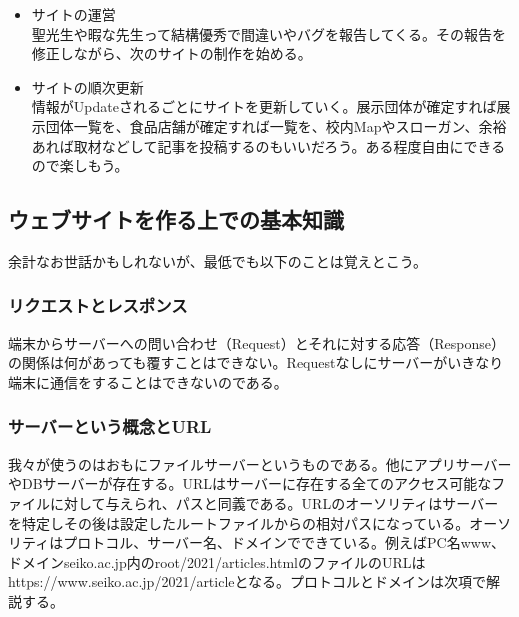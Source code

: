 \documentclass[dvipdfmx,jb5]{jarticle}
\begin{document}
\begin{itemize}
  公開には時間がかかるため、SNSや学校のサイトで告知される前にはもう公開しちゃおう。（どうせ調べても出てこない）その際、しっかりSEO対策\footnote{SEO対策とはGoogleなどの検索エンジンロボットにサイトの内容をより正確に取得してもらうようにすることを指す。}をする。僕はサボっててサイトの説明文すら書いてなかったが途中で気づいて書いた。サイトの公開後はGoogleSearchConsoleにサイトを登録。Google検索で自分のサイトがどれくらい検索されてて掲載順位がどのくらいなのかをみることができる。GoogleRobotがどのくらい来たかもみれる。登録にはサイトの所有者を証明する必要があるため、Googleからもらったhtmlを直下に置いたり、metaタグを追加したりする。所有者が証明できたらとりあえず安心できると思う。3日後ぐらいまでには記録が開始され、掲載順位や訪問者数のグラフが表示されるだろう。
  \item サイトの運営\\
  聖光生や暇な先生って結構優秀で間違いやバグを報告してくる。その報告を修正しながら、次のサイトの制作を始める。
  \item サイトの順次更新\\
  情報がUpdateされるごとにサイトを更新していく。展示団体が確定すれば展示団体一覧を、食品店舗が確定すれば一覧を、校内Mapやスローガン、余裕あれば取材などして記事を投稿するのもいいだろう。ある程度自由にできるので楽しもう。
 \end{itemize}
 \subsection{ウェブサイトを作る上での基本知識}
 余計なお世話かもしれないが、最低でも以下のことは覚えとこう。
 \subsubsection{リクエストとレスポンス}
 端末からサーバーへの問い合わせ（Request）とそれに対する応答（Response）の関係は何があっても覆すことはできない。Requestなしにサーバーがいきなり端末に通信をすることはできないのである。
 \subsubsection{サーバーという概念とURL}
 我々が使うのはおもにファイルサーバーというものである。他にアプリサーバーやDBサーバーが存在する。URLはサーバーに存在する全てのアクセス可能なファイルに対して与えられ、パスと同義である。URLのオーソリティはサーバーを特定しその後は設定したルートファイルからの相対パスになっている。オーソリティはプロトコル、サーバー名、ドメインでできている。例えばPC名www、ドメインseiko.ac.jp内のroot/2021/articles.htmlのファイルのURLはhttps://www.seiko.ac.jp/2021/articleとなる。プロトコルとドメインは次項で解説する。
\end{document}
